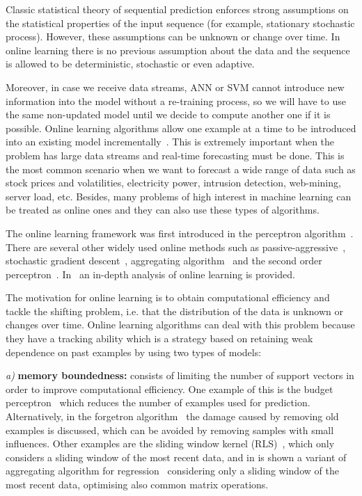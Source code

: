 Classic statistical theory of sequential prediction enforces strong assumptions on the statistical properties of the input sequence (for example, stationary stochastic process). However, these assumptions can be unknown or change over time. In online learning there is no previous assumption about the data and the sequence is allowed to be deterministic, stochastic or even adaptive.  

Moreover, in case we receive data streams, ANN or SVM cannot introduce new information into the model without a re-training process, so we will have to use the same non-updated model until we decide to compute another one if it is possible.  Online learning algorithms allow one example at a time to be introduced into an existing model incrementally~\cite{vovk2005}. This is extremely important when the problem has large data streams and real-time forecasting must be done.  This is the most common scenario when we want to forecast a wide range of data such as stock prices and volatilities, electricity power, intrusion detection, web-mining, server load, etc.  Besides, many problems of high interest in machine learning can be treated as online ones and they can also use these types of algorithms.

The online learning framework was first introduced in the perceptron algorithm~\cite{rosenblatt58}. There are several other widely used online methods such as passive-aggressive~\cite{crammerETall2006}, stochastic gradient descent~\cite{zhang2004}, aggregating algorithm~\cite{vovk2001} and the second order perceptron~\cite{cesa-bianchi2005}.  In~\cite{cesa-bianchi2006} an in-depth analysis of online learning is provided.

The motivation for online learning is to obtain computational efficiency and tackle the shifting problem, i.e. that the distribution of the data is unknown or changes over time. Online learning algorithms can deal with this problem because they have a tracking ability which is a strategy based on retaining weak dependence on past examples by using two types of models: 

\textit{a)} \textbf{memory boundedness:} consists of limiting the number of support vectors in order to improve computational efficiency. One example of this is the budget perceptron~\cite{crammeretal2004} which reduces the number of examples used for prediction. Alternatively, in the forgetron algorithm~\cite{dekeletal2008} the damage caused by removing old examples is discussed, which can be avoided by removing samples with small influences. Other examples are the sliding window kernel (RLS)~\cite{vanvaerenberghetal2006}, which only considers a sliding window of the most recent data, and in \cite{arce+salinas2012} is shown a variant of aggregating algorithm for regression~\cite{vovk2001} considering only a sliding window of the most recent data, optimising also common matrix operations.

